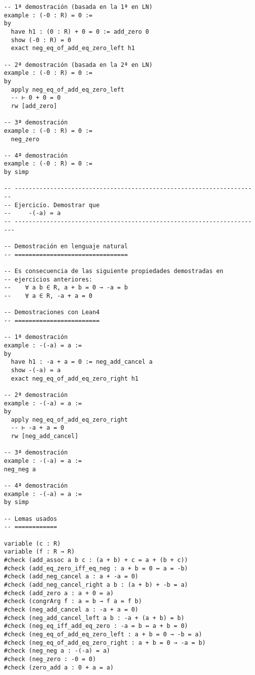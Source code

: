 \begin{verbatim}
-- 1ª demostración (basada en la 1ª en LN)
example : (-0 : R) = 0 :=
by
  have h1 : (0 : R) + 0 = 0 := add_zero 0
  show (-0 : R) = 0
  exact neg_eq_of_add_eq_zero_left h1

-- 2ª demostración (basada en la 2ª en LN)
example : (-0 : R) = 0 :=
by
  apply neg_eq_of_add_eq_zero_left
  -- ⊢ 0 + 0 = 0
  rw [add_zero]

-- 3ª demostración
example : (-0 : R) = 0 :=
  neg_zero

-- 4ª demostración
example : (-0 : R) = 0 :=
by simp

-- ---------------------------------------------------------------------
-- Ejercicio. Demostrar que
--     -(-a) = a
-- ----------------------------------------------------------------------

-- Demostración en lenguaje natural
-- ================================

-- Es consecuencia de las siguiente propiedades demostradas en
-- ejercicios anteriores:
--    ∀ a b ∈ R, a + b = 0 → -a = b
--    ∀ a ∈ R, -a + a = 0

-- Demostraciones con Lean4
-- ========================

-- 1ª demostración
example : -(-a) = a :=
by
  have h1 : -a + a = 0 := neg_add_cancel a
  show -(-a) = a
  exact neg_eq_of_add_eq_zero_right h1

-- 2ª demostración
example : -(-a) = a :=
by
  apply neg_eq_of_add_eq_zero_right
  -- ⊢ -a + a = 0
  rw [neg_add_cancel]

-- 3ª demostración
example : -(-a) = a :=
neg_neg a

-- 4ª demostración
example : -(-a) = a :=
by simp

-- Lemas usados
-- ============

variable (c : R)
variable (f : R → R)
#check (add_assoc a b c : (a + b) + c = a + (b + c))
#check (add_eq_zero_iff_eq_neg : a + b = 0 ↔ a = -b)
#check (add_neg_cancel a : a + -a = 0)
#check (add_neg_cancel_right a b : (a + b) + -b = a)
#check (add_zero a : a + 0 = a)
#check (congrArg f : a = b → f a = f b)
#check (neg_add_cancel a : -a + a = 0)
#check (neg_add_cancel_left a b : -a + (a + b) = b)
#check (neg_eq_iff_add_eq_zero : -a = b ↔ a + b = 0)
#check (neg_eq_of_add_eq_zero_left : a + b = 0 → -b = a)
#check (neg_eq_of_add_eq_zero_right : a + b = 0 → -a = b)
#check (neg_neg a : -(-a) = a)
#check (neg_zero : -0 = 0)
#check (zero_add a : 0 + a = a)
\end{verbatim}

